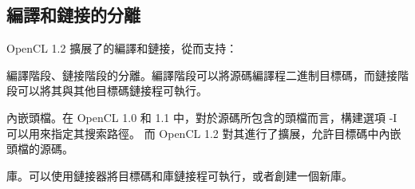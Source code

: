 \subsection{編譯和鏈接的分離}

OpenCL 1.2 擴展了的編譯和鏈接，從而支持：
\startigBase
\item 編譯階段、鏈接階段的分離。編譯階段可以將源碼編譯程二進制目標碼，而鏈接階段可以將其與其他目標碼鏈接程可執行。

\item 內嵌頭檔。在 OpenCL 1.0 和 1.1 中，對於源碼所包含的頭檔而言，構建選項 -I 可以用來指定其搜索路徑。
而 OpenCL 1.2 對其進行了擴展，允許目標碼中內嵌頭檔的源碼。

\item 庫。可以使用鏈接器將目標碼和庫鏈接程可執行，或者創建一個新庫。
\stopigBase



